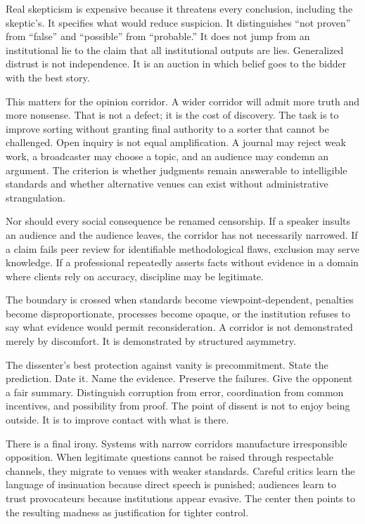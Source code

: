 ﻿\documentclass[12pt,a4paper]{book}
\begin{document}
Real skepticism is expensive because it threatens every conclusion, including the skeptic's. It specifies what would reduce suspicion. It distinguishes “not proven” from “false” and “possible” from “probable.” It does not jump from an institutional lie to the claim that all institutional outputs are lies. Generalized distrust is not independence. It is an auction in which belief goes to the bidder with the best story.

This matters for the opinion corridor. A wider corridor will admit more truth and more nonsense. That is not a defect; it is the cost of discovery. The task is to improve sorting without granting final authority to a sorter that cannot be challenged. Open inquiry is not equal amplification. A journal may reject weak work, a broadcaster may choose a topic, and an audience may condemn an argument. The criterion is whether judgments remain answerable to intelligible standards and whether alternative venues can exist without administrative strangulation.

Nor should every social consequence be renamed censorship. If a speaker insults an audience and the audience leaves, the corridor has not necessarily narrowed. If a claim fails peer review for identifiable methodological flaws, exclusion may serve knowledge. If a professional repeatedly asserts facts without evidence in a domain where clients rely on accuracy, discipline may be legitimate.

The boundary is crossed when standards become viewpoint-dependent, penalties become disproportionate, processes become opaque, or the institution refuses to say what evidence would permit reconsideration. A corridor is not demonstrated merely by discomfort. It is demonstrated by structured asymmetry.

The dissenter's best protection against vanity is precommitment. State the prediction. Date it. Name the evidence. Preserve the failures. Give the opponent a fair summary. Distinguish corruption from error, coordination from common incentives, and possibility from proof. The point of dissent is not to enjoy being outside. It is to improve contact with what is there.

There is a final irony. Systems with narrow corridors manufacture irresponsible opposition. When legitimate questions cannot be raised through respectable channels, they migrate to venues with weaker standards. Careful critics learn the language of insinuation because direct speech is punished; audiences learn to trust provocateurs because institutions appear evasive. The center then points to the resulting madness as justification for tighter control.
\end{document}
